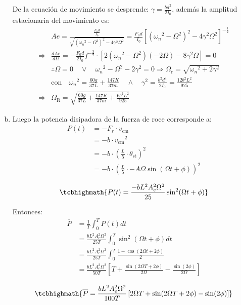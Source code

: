 \begin{enumerate}[a)]
De la ecuación de movimiento se desprende: \(\gamma=\frac{bd^2}{2I_0}\), además la amplitud estacionaria del movimiento es:
\begin{align*}
&Ae=\frac{\frac{F_0d}{I_0}}{\sqrt{{\left({\omega_n}^2-\Omega^2\right)}^2-4\gamma^2\Omega^2}}=\frac{F_0d}{I_0}{\left[{\left({\omega_n}^2-\Omega^2\right)}^2-4\gamma^2\Omega^2\right]}^{-\frac{1}{2}}\\
\Rightarrow &\frac{dAe}{d\Omega}=-\frac{F_0d}{2I_0}f^{-\frac{3}{2}}\cdot \left[2\left({\omega_n}^2-\Omega^2\right)(-2\Omega)-8\gamma^2\Omega\right]=0\\
&\therefore \Omega=0\quad \vee\quad {\omega_n}^2-\Omega^2-2\gamma^2=0 \Rightarrow \Omega_{\text{r}}=\sqrt{{\omega_n}^2+2\gamma^2}\\
&\text{con}\quad{\omega_n}^2=\frac{60g}{37L}+\frac{147K}{37m}\quad\wedge\quad\gamma^2=\frac{b^2d^4}{2I_0}=\frac{12b^2L^2}{925}\\
\Rightarrow &\Omega_{\text{R}}=\sqrt{\frac{60g}{37L}+\frac{147K}{37m}+\frac{6b^2L^2}{925}}
\end{align*}

\item



Luego la potencia disipadora de la fuerza de roce corresponde a:
\begin{align*}
P(t)&=-F_r\cdot v_{\text{cm}}\\
&=-b\cdot{v_{\text{cm}}}^2\\
&=-b\cdot{\left(\frac{L}{5}\cdot\theta_{\text{st}}\right)}^2\\
&=-b\cdot{\left(\frac{L}{5}\cdot-A\Omega\sin(\Omega t+\phi)\right)}^2\\
\end{align*}
\begin{equation*}
\tcbhighmath{P(t)=\frac{-bL^2A_e^2\Omega^2}{25}\sin^2(\Omega t+\phi)}
\end{equation*}

Entonces:
\begin{align*}
\overline{P}&=\frac{1}{T}\int_0^TP(t)dt\\
&=\frac{bL^2A_e^2\Omega^2}{25T}\int_0^T\sin^2(\Omega t+\phi)dt\\
&=\frac{bL^2A_e^2\Omega^2}{25T}\int_0^T\frac{1-\cos(2\Omega t+2\phi)}{2}\\
&=\frac{bL^2A_e^2\Omega^2}{50T}\left[T+\frac{\sin(2\Omega T+2\phi)}{2\Omega}-\frac{\sin(2\phi)}{2\Omega}\right]\\
\end{align*}
\begin{equation*}
\tcbhighmath{\overline{P}=\frac{bL^2A_e^2\Omega^2}{100T}\left[2\Omega T+\sin(2\Omega T+2\phi) -\sin(2\phi)\right]}
\end{equation*}
\end{enumerate}